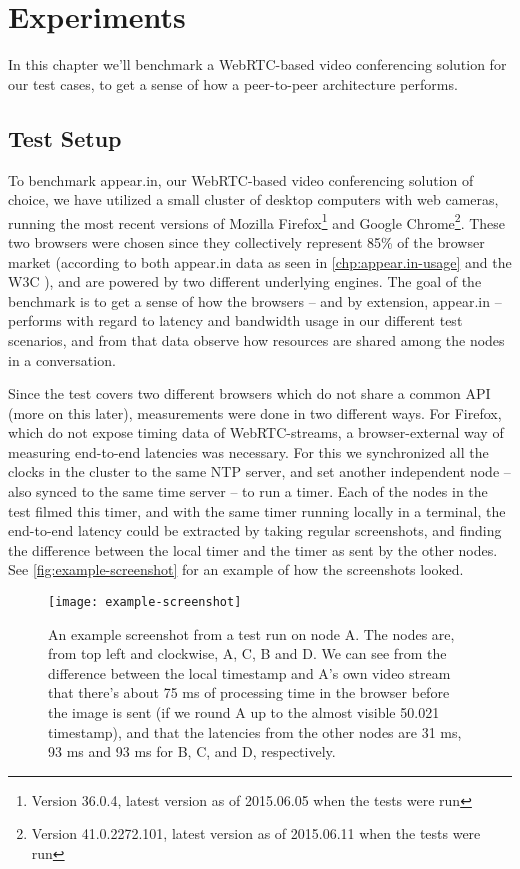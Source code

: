 \chapter{Experiments}\label{chp:experiments}

In this chapter we'll benchmark a WebRTC-based video conferencing solution for our test cases, to get a sense of how a peer-to-peer architecture performs.


\section{Test Setup}

To benchmark appear.in, our WebRTC-based video conferencing solution of choice, we have utilized a small cluster of desktop computers with web cameras, running the most recent versions of Mozilla Firefox\footnote{Version 36.0.4, latest version as of 2015.06.05 when the tests were run} and Google Chrome\footnote{Version 41.0.2272.101, latest version as of 2015.06.11 when the tests were run}. These two browsers were chosen since they collectively represent 85\% of the browser market (according to both appear.in data as seen in \autoref{chp:appear.in-usage} and the W3C \cite{browser-stats}), and are powered by two different underlying engines. The goal of the benchmark is to get a sense of how the browsers -- and by extension, appear.in -- performs with regard to latency and bandwidth usage in our different test scenarios, and from that data observe how resources are shared among the nodes in a conversation.

Since the test covers two different browsers which do not share a common API (more on this later), measurements were done in two different ways. For Firefox, which do not expose timing data of WebRTC-streams, a browser-external way of measuring end-to-end latencies was necessary. For this we synchronized all the clocks in the cluster to the same \gls{NTP} server, and set another independent node -- also synced to the same time server -- to run a timer. Each of the nodes in the test filmed this timer, and with the same timer running locally in a terminal, the end-to-end latency could be extracted by taking regular screenshots, and finding the difference between the local timer and the timer as sent by the other nodes. See \autoref{fig:example-screenshot} for an example of how the screenshots looked.

\begin{figure}
    \centering
    \texttt{[image: example-screenshot]}
    \caption{An example screenshot from a test run on node A. The nodes are, from top left and clockwise, A, C, B and D. We can see from the difference between the local timestamp and A's own video stream that there's about 75 ms of processing time in the browser before the image is sent (if we round A up to the almost visible 50.021 timestamp), and that the latencies from the other nodes are 31 ms, 93 ms and 93 ms for B, C, and D, respectively.}
    \label{fig:example-screenshot}
\end{figure}

